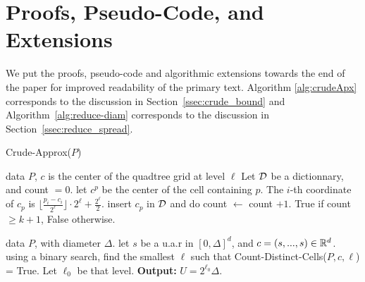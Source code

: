 \section{Proofs, Pseudo-Code, and Extensions}

We put the proofs, pseudo-code and algorithmic extensions towards the end of the paper for improved readability of the primary text.  Algorithm
\ref{alg:crudeApx} corresponds to the discussion in Section~\ref{ssec:crude_bound} and Algorithm~\ref{alg:reduce-diam} corresponds to the discussion in
Section~\ref{ssec:reduce_spread}.

\label{app:pseudoCode}
\begin{algorithm}[tb]
   \caption{Crude-Approx($P$)}
   \label{alg:crudeApx}
\begin{algorithmic}[1]
 \Comment data $P$, $c$ is the center of the quadtree grid at level $\ell$
   \State Let $\mathcal D$ be a dictionnary, and count $= 0$.
   \State let $c^p$ be the center of the cell containing $p$. The $i$-th coordinate of $c_p$ is $\lfloor \frac{p_i - c_i}{2^\ell}\rfloor  \cdot 2^\ell + \frac{2^{\ell}}{2}$. 
   \State insert $c_p$ in $\mathcal D$ and do count $\gets$ count $+1$.
   \EndIf
   \EndFor
    True if count $\geq k+1$, False otherwise.
   \EndProcedure
   
    \Comment data $P$, with diameter $\Delta$.
   \State let $s$ be a u.a.r in $[0, \Delta]^d$, and $c = (s,..., s) \in \mathbb{R}^d$.
   \State using a binary search, find the smallest $\ell$ such that Count-Distinct-Cells($P, c, \ell$) = True. Let $\ell_0$ be that level.
   \State \textbf{Output:} $U = 2^{\ell_0} \Delta$.
   \EndProcedure
\end{algorithmic}
\end{algorithm}

